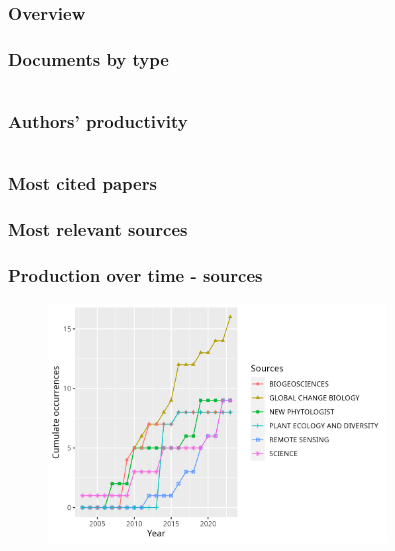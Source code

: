 \documentclass[aspectratio=169]{beamer}
\begin{document}
\begin{frame}
	\frametitle{Overview}
	\centering
	\small
	
\end{frame}

\begin{frame}
	\frametitle{Documents by type}
	\centering
	\small
	
\end{frame}

\begin{frame}
	\begin{columns}
		\begin{column}{0.5\textwidth}
			\frametitle{Authors' productivity}
			\centering
			\small
			
		\end{column}
		\begin{column}{0.5\textwidth}
			\centering
			\small
			
		\end{column}
	\end{columns}
\end{frame}

\begin{frame}
	\frametitle{Most cited papers}
	\centering
	\small
	
\end{frame}

\begin{frame}
	\frametitle{Most relevant sources}
	\centering
	\scriptsize
	
\end{frame}

\begin{frame}
	\frametitle{Production over time - sources}
	\begin{figure}
		\centering
		\includegraphics[width=0.8\textwidth]
        {figures/sources_production_over_time.png}
	\end{figure}
\end{frame}
\end{document}
